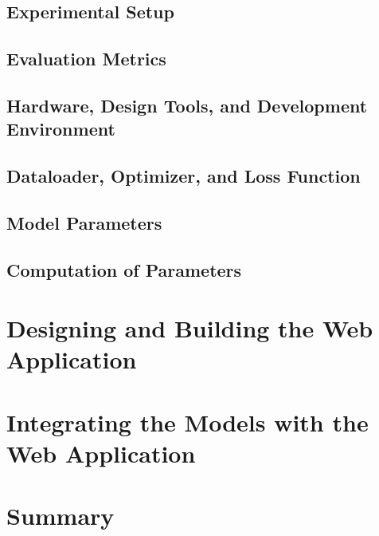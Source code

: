 \subsection{Experimental Setup}
\label{sec:experimental-setup}

\subsection{Evaluation Metrics}
\label{sec:metrics}

\subsection{Hardware, Design Tools, and Development Environment}
\label{sec:hardware}

\subsection{Dataloader, Optimizer, and Loss Function}
\label{sec:optim}

\subsection{Model Parameters}
\label{sec:model-params}

\subsection{Computation of Parameters}
\label{sec:param-computation}

\section{Designing and Building the Web Application}
\label{sec:webapp-design}

\section{Integrating the Models with the Web Application}
\label{sec:webapp-integration}

\section{Summary}
\label{sec:method-summary}
